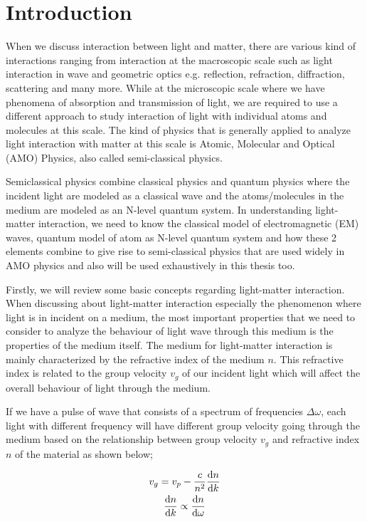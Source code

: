 \chapter{Introduction}
When we discuss interaction between light and matter, there are various kind of interactions ranging from interaction at the macroscopic scale such as light interaction in wave and geometric optics e.g. reflection, refraction, diffraction, scattering and many more. While at the microscopic scale where we have phenomena of absorption and transmission of light, we are required to use a different approach to study interaction of light with individual atoms and molecules at this scale. The kind of physics that is generally applied to analyze light interaction with matter at this scale is Atomic, Molecular and Optical (AMO) Physics, also called semi-classical physics.

Semiclassical physics combine classical physics and quantum physics where the incident light are modeled as a classical wave and the atoms/molecules in the medium are modeled as an N-level quantum system. In understanding light-matter interaction, we need to know the classical model of electromagnetic (EM) waves, quantum model of atom as N-level quantum system and how these 2 elements combine to give rise to semi-classical physics that are used widely in AMO physics and also will be used exhaustively in this thesis too.

Firstly, we will review some basic concepts regarding light-matter interaction. When discussing about light-matter interaction especially the phenomenon where light is in incident on a medium, the most important properties that we need to consider to analyze the behaviour of light wave through this medium is the properties of the medium itself. The medium for light-matter interaction is mainly characterized by the refractive index of the medium $n$. This refractive index is related to the group velocity $v_g$ of our incident light which will affect the overall behaviour of light through the medium.

If we have a pulse of wave that consists of a spectrum of frequencies $\Delta\omega$, each light with different frequency will have different group velocity going through the medium based on the relationship between group velocity $v_g$ and refractive index $n$ of the material as shown below;

\begin{gather}
	v_g = v_p - \frac{c}{n^2} \dv{n}{k} \label{eqn: groupVelocity}\\
	\dv{n}{k} \propto \dv{n}{\omega}
\end{gather}

